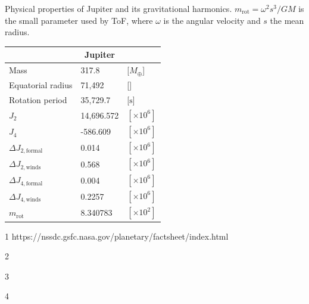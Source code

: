 \documentclass[usenatbib]{mnras}
\newcommand{\sub}[1]{_{\text{#1}}}
\begin{document}
\begin{threeparttable}
    \renewcommand\TPTminimum{\linewidth}
	\caption{Physical properties of Jupiter and its gravitational harmonics. $m\sub{rot}= \omega^2s^3/GM$ is the small parameter used by ToF, where $\omega$ is the angular velocity and $s$ the mean radius.}
	\begin{tabular}{l|ll}
			& \multicolumn{1}{c}{\textbf{Jupiter}} \\
		    \midrule
		Mass \tnote{1}		 	    & 317.8	     & [$M_\oplus$]\\  
		Equatorial radius \tnote{1}			& 71,492     & [\text{km}]\\ 
		Rotation period \tnote{2}	& 35,729.7	 & [$\text{s}$]\\ 
		$J_{2}$ \tnote{3}			& 14,696.572 & $[\times10^6]$\\ 
		$J_{4}$ \tnote{3}			& -586.609 & $[\times10^6]$\\ 
		$\Delta J_{2,\text{formal}}$ \tnote{3} & 0.014	 & $[\times10^6]$\\  
		$\Delta J_{2,\text{winds}}$ \tnote{4}  & 0.568  & $[\times10^6]$\\
		$\Delta J_{4,\text{formal}}$ \tnote{3} & 0.004	 & $[\times10^6]$\\  
		$\Delta J_{4,\text{winds}}$ \tnote{4}  & 0.2257  & $[\times10^6]$\\
		$m\sub{rot}$                   & 8.340783   & $[\times10^2]$\\
	\end{tabular} 
	\begin{tablenotes}
	    \item[1] https://nssdc.gsfc.nasa.gov/planetary/factsheet/index.html 
	    \item[2] \cite{RIDDLE1976}
	    \item[3] \cite{NatureIess}
	    \item[4] \cite{Kaspi2018}
	\end{tablenotes}
	\label{tab:jupiter_properties}
\end{threeparttable}
\end{document}
